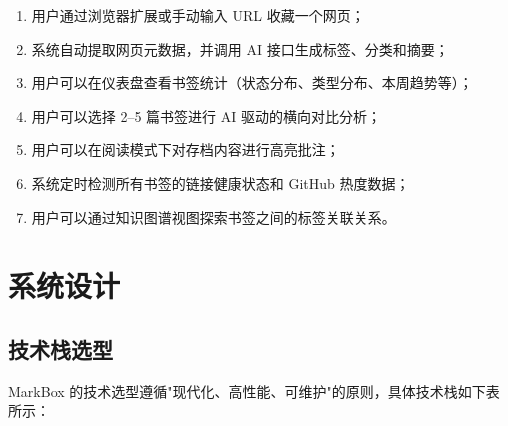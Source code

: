 \documentclass[12pt,a4paper]{ctexart}
\begin{document}
\begin{enumerate}[label=(\arabic*)]
  \item 用户通过浏览器扩展或手动输入 URL 收藏一个网页；
  \item 系统自动提取网页元数据，并调用 AI 接口生成标签、分类和摘要；
  \item 用户可以在仪表盘查看书签统计（状态分布、类型分布、本周趋势等）；
  \item 用户可以选择 2--5 篇书签进行 AI 驱动的横向对比分析；
  \item 用户可以在阅读模式下对存档内容进行高亮批注；
  \item 系统定时检测所有书签的链接健康状态和 GitHub 热度数据；
  \item 用户可以通过知识图谱视图探索书签之间的标签关联关系。
\end{enumerate}

\section{系统设计}
\label{sec:design}

\subsection{技术栈选型}

MarkBox 的技术选型遵循"现代化、高性能、可维护"的原则，具体技术栈如下表所示：
\end{document}
